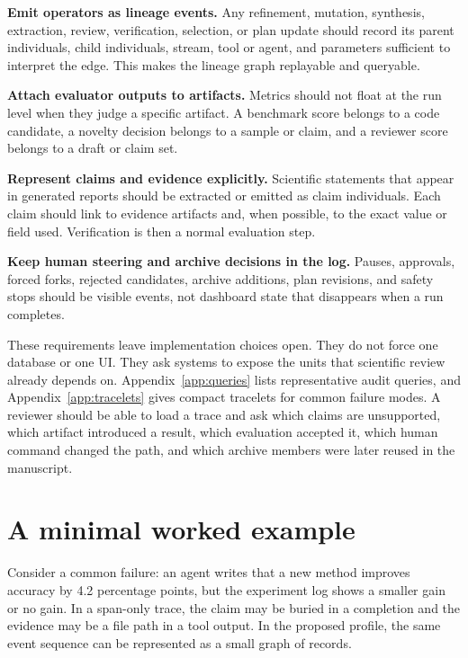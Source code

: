 \documentclass{article}
\begin{document}
\textbf{Emit operators as lineage events.} Any refinement, mutation, synthesis, extraction, review, verification, selection, or plan update should record its parent individuals, child individuals, stream, tool or agent, and parameters sufficient to interpret the edge. This makes the lineage graph replayable and queryable.

\textbf{Attach evaluator outputs to artifacts.} Metrics should not float at the run level when they judge a specific artifact. A benchmark score belongs to a code candidate, a novelty decision belongs to a sample or claim, and a reviewer score belongs to a draft or claim set.

\textbf{Represent claims and evidence explicitly.} Scientific statements that appear in generated reports should be extracted or emitted as claim individuals. Each claim should link to evidence artifacts and, when possible, to the exact value or field used. Verification is then a normal evaluation step.

\textbf{Keep human steering and archive decisions in the log.} Pauses, approvals, forced forks, rejected candidates, archive additions, plan revisions, and safety stops should be visible events, not dashboard state that disappears when a run completes.

These requirements leave implementation choices open. They do not force one database or one UI. They ask systems to expose the units that scientific review already depends on. Appendix~\ref{app:queries} lists representative audit queries, and Appendix~\ref{app:tracelets} gives compact tracelets for common failure modes. A reviewer should be able to load a trace and ask which claims are unsupported, which artifact introduced a result, which evaluation accepted it, which human command changed the path, and which archive members were later reused in the manuscript.

\section{A minimal worked example}

Consider a common failure: an agent writes that a new method improves accuracy by 4.2 percentage points, but the experiment log shows a smaller gain or no gain. In a span-only trace, the claim may be buried in a completion and the evidence may be a file path in a tool output. In the proposed profile, the same event sequence can be represented as a small graph of records.
\end{document}
